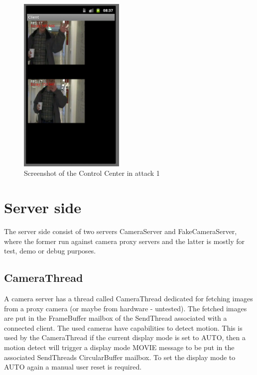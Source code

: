 \documentclass[8pt,titlepage]{article}
\begin{document}
\begin{figure}[hbp]
\includegraphics[width=0.45\textwidth]{../screenshots/androidSyncing.png}
\caption{Screenshot of the Control Center in attack 1}
\end{figure}








\section{Server side}
The server side consist of two servers CameraServer and FakeCameraServer, where the former run against camera proxy servers and the latter is mostly for test, demo or debug purposes.



\subsection{CameraThread}
A camera server has a thread called CameraThread dedicated for fetching images from a proxy camera (or maybe from hardware - untested). The fetched images are put in the FrameBuffer mailbox of the SendThread associated with a connected client. The used cameras have capabilities to detect motion. This is used by the CameraThread if the current display mode is set to AUTO, then a motion detect will trigger a display mode MOVIE message to be put in the associated SendThreads CircularBuffer mailbox. To set the display mode to AUTO again a manual user reset is required. 
\end{document}
